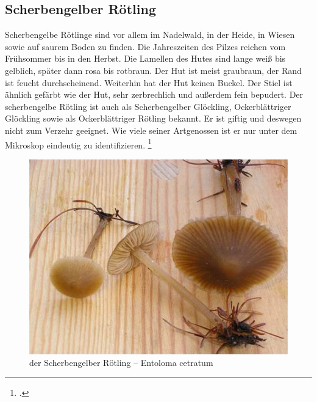 \documentclass[a4paper,abstracton]{scrreprt}
\begin{document}
\subsection{Scherbengelber Rötling}
Scherbengelbe Rötlinge sind vor allem im Nadelwald, in der Heide, in Wiesen sowie auf saurem Boden zu finden. Die Jahreszeiten des Pilzes reichen vom Frühsommer bis in den Herbst. Die Lamellen des Hutes sind lange weiß bis gelblich, später dann rosa bis rotbraun. Der Hut ist meist graubraun, der Rand ist feucht durchscheinend. Weiterhin hat der Hut keinen Buckel. Der Stiel ist ähnlich gefärbt wie der Hut, sehr zerbrechlich und außerdem fein bepudert.
Der scherbengelbe Rötling ist auch als Scherbengelber Glöckling, Ockerblättriger Glöckling sowie als Ockerblättriger Rötling bekannt. Er ist giftig und deswegen nicht zum Verzehr geeignet. Wie viele seiner Artgenossen ist er nur unter dem Mikroskop eindeutig zu identifizieren.
\footcite{scherbengelb}
\begin{figure}[H]
\centering
\includegraphics[scale=0.6]{scherbengelb}
\caption{der Scherbengelber Rötling -- Entoloma cetratum }
\label{fig:scherbengelb}
\end{figure}

\printbibliography[heading=lit]
\end{document}
